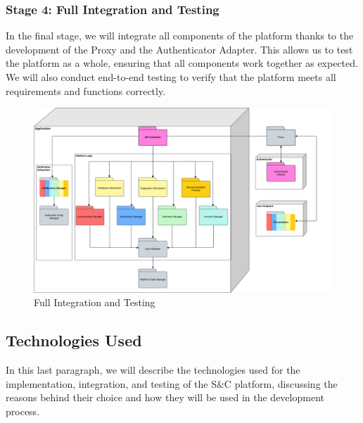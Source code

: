     \subsubsection{Stage 4: Full Integration and Testing}
    In the final stage, we will integrate all components of the platform thanks to the development of the Proxy and the Authenticator Adapter. This allows us to test the platform as a whole, ensuring that all components work together as expected. We will also conduct end-to-end testing to verify that the platform meets all requirements and functions correctly.
    \begin{figure}[H]
    \includegraphics[width=\linewidth]{Latex/Images/DD/Testing/TestingPlanStep4.png}
    \caption{Full Integration and Testing}
    \label{fig:test-step4}
    \end{figure}
    \subsection{Technologies Used}
    In this last paragraph, we will describe the technologies used for the implementation, integration, and testing of the S\&C platform, discussing the reasons behind their choice and how they will be used in the development process.\\
